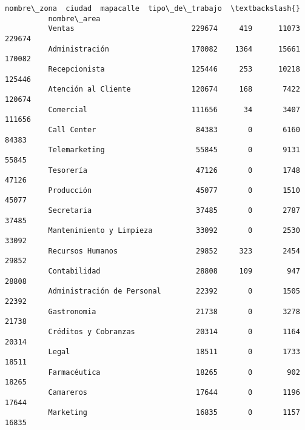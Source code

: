 \documentclass[11pt]{article}
\begin{document}
\begin{Verbatim}[commandchars=\\\{\}]
                                      nombre\_zona  ciudad  mapacalle  tipo\_de\_trabajo  \textbackslash{}
          nombre\_area                                                                   
          Ventas                           229674     419      11073           229674   
          Administración                   170082    1364      15661           170082   
          Recepcionista                    125446     253      10218           125446   
          Atención al Cliente              120674     168       7422           120674   
          Comercial                        111656      34       3407           111656   
          Call Center                       84383       0       6160            84383   
          Telemarketing                     55845       0       9131            55845   
          Tesorería                         47126       0       1748            47126   
          Producción                        45077       0       1510            45077   
          Secretaria                        37485       0       2787            37485   
          Mantenimiento y Limpieza          33092       0       2530            33092   
          Recursos Humanos                  29852     323       2454            29852   
          Contabilidad                      28808     109        947            28808   
          Administración de Personal        22392       0       1505            22392   
          Gastronomia                       21738       0       3278            21738   
          Créditos y Cobranzas              20314       0       1164            20314   
          Legal                             18511       0       1733            18511   
          Farmacéutica                      18265       0        902            18265   
          Camareros                         17644       0       1196            17644   
          Marketing                         16835       0       1157            16835   
          

\end{Verbatim}
\end{document}

